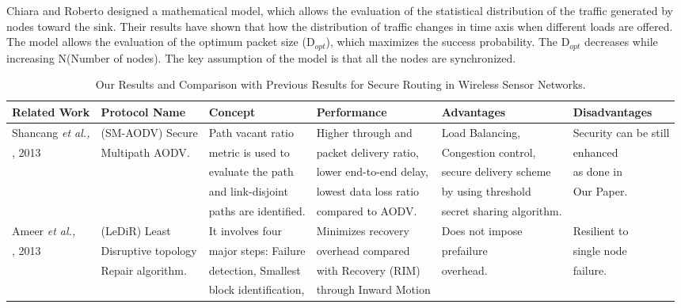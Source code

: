 \documentclass[journal]{IEEEtran}
\begin{document}
\indent Chiara and Roberto \cite{Model} designed a mathematical model, which allows the evaluation of the statistical distribution of the traffic generated by nodes toward the sink. Their results have shown that how the distribution of traffic changes in time axis when different loads are offered. The model allows the evaluation of the optimum packet size (D$_{opt}$), which maximizes the success probability. The D$_{opt}$ decreases while increasing N(Number of nodes). The key assumption of the model is that all the nodes are synchronized.

\begin{table*}
\begin{center}
\caption{Our Results and Comparison with Previous Results for Secure Routing in Wireless Sensor Networks.}
\begin{tabular}{ |   l    |   l    |   l    |   l    |   l    |   l    | }  \hline 
\label{table:comp}  
\bfseries{Related Work}&\bfseries{Protocol Name}&\bfseries{Concept}&\bfseries{Performance}&\bfseries{Advantages}&\bfseries{Disadvantages}\\\hline   
Shancang \emph{et al.,}& (SM-AODV) Secure   & Path vacant ratio & Higher through and    & Load Balancing, & Security can be still\\   
\cite{SMAODV}, 2013   & Multipath AODV.     & metric is used to & packet delivery ratio,& Congestion control,& enhanced    \\  
                      &                     & evaluate the path & lower end-to-end delay,&secure delivery scheme& as done in  \\
		      &         	    & and link-disjoint & lowest data loss ratio &by using threshold    & Our Paper. \\ 
		      &                     & paths are identified.& compared to AODV.   &secret sharing algorithm.&        \\ \hline   
Ameer \emph{et al.,}  & (LeDiR) Least       & It involves four &   Minimizes recovery  & Does not impose & Resilient to \\    
\cite{LeDiR}, 2013    & Disruptive topology & major steps: Failure& overhead compared  & prefailure    & single node  \\     
                      & Repair algorithm.   & detection, Smallest & with Recovery (RIM)& overhead.    &  failure. \\ 
                      &                     & block identification,&through Inward Motion&             &    \\ 

\end{tabular}
\end{center}
\end{table*}
\end{document}
